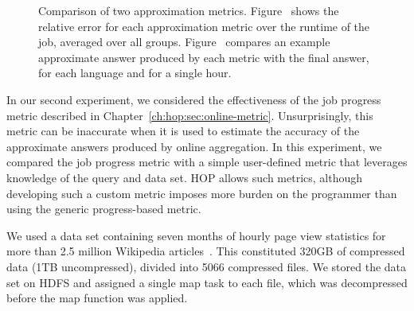 \begin{figure}[ht]
\ssp
  \centering
  \caption{Comparison of two approximation
    metrics. Figure~\protect{} shows the relative error for
    each approximation metric over the runtime of the job, averaged over all
    groups. Figure~\protect{} compares an example approximate
    answer produced by each metric with the final answer, for each language and for a single hour.}
\label{fig:approx}
\end{figure}

In our second experiment, we considered the effectiveness of the job progress
metric described in Chapter~\ref{ch:hop:sec:online-metric}. Unsurprisingly, this metric
can be inaccurate when it is used to estimate the accuracy of the approximate
answers produced by online aggregation. In this experiment, we compared the job
progress metric with a simple user-defined metric that leverages knowledge of
the query and data set. HOP allows such metrics, although developing such a
custom metric imposes more burden on the programmer than using the generic
progress-based metric.

We used a data set containing seven months of hourly page view statistics for
more than 2.5 million Wikipedia articles~\cite{wikistats}. This constituted
320GB of compressed data (1TB uncompressed), divided into 5066 compressed
files. We stored the data set on HDFS and assigned a single map task to each
file, which was decompressed before the map function was applied.

